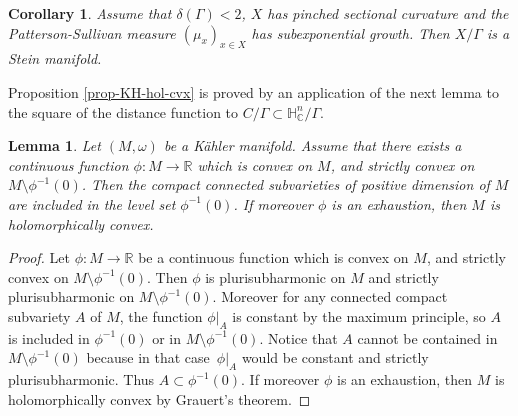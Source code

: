 \documentclass[11pt]{article}
\newtheorem{corollary}[theorem]{Corollary}
\newtheorem{lemma}[theorem]{Lemma}
\theoremstyle{definition}
\newcommand{\C}{\mathbb{C}}
\newcommand{\R}{\mathbb{R}}
\newcommand{\HNC}{\mathbb{H}^{n}_{\C}}
\def\C{\mathbb{C}}
\newcommand{\HNC}{\mathbb{H}^{n}_{\C}}
\begin{document}
\begin{corollary}\label{cor:delta-croissance-ssexp}
Assume that $\delta(\Gamma)<2$, $X$ has pinched sectional curvature and the Patterson-Sullivan measure $(\mu_x)_{x\in X}$ has subexponential growth. Then $X/\Gamma$ is a Stein manifold.
\end{corollary}

Proposition \ref{prop-KH-hol-cvx} is proved by an application of the next lemma to the square of the distance function to $C/\Gamma\subset\HNC/\Gamma$.

\begin{lemma}\label{lem-cvx-psh}
Let $(M,\omega)$ be a Kähler manifold. Assume that there exists a continuous function $\phi:M\to \R$ which is convex on $M$, and strictly convex on $M\setminus \phi^{-1}(0)$. Then the compact connected subvarieties of positive dimension of $M$ are included in the level set $\phi^{-1}(0)$. If moreover $\phi$ is an exhaustion, then $M$ is holomorphically convex.
\end{lemma}

\begin{proof}
Let $\phi:M\to \R$ be a continuous function which is convex on $M$, and strictly convex on $M\setminus \phi^{-1}(0)$. Then $\phi$ is plurisubharmonic on $M$ and strictly plurisubharmonic on $M\setminus \phi^{-1}(0)$. Moreover for any connected compact subvariety $A$ of $M$, the function $\phi\vert_{A}$ is constant by the maximum principle, so $A$ is included in $\phi^{-1}(0)$ or in $M\setminus \phi^{-1}(0)$. Notice that $A$ cannot be contained in $M\setminus \phi^{-1}(0)$ because in that case~$\phi\vert_{A}$ would be constant and strictly plurisubharmonic. Thus $A\subset \phi^{-1}(0)$. If moreover $\phi$ is an exhaustion, then $M$ is holomorphically convex by Grauert's theorem.
\end{proof}
\end{document}
